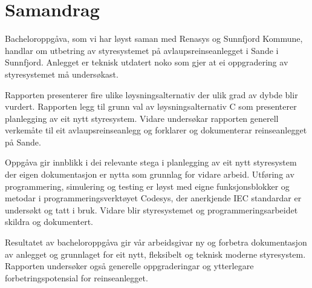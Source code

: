 \chapter{Samandrag}
\thispagestyle{romanpages}

Bacheloroppgåva, som vi har løyst saman med \gls{Renasys} og \gls{Sunnfjord Kommune}, handlar om utbetring av styresystemet på 
avlaupsreinseanlegget i Sande i Sunnfjord. 
Anlegget er teknisk utdatert noko som gjer at ei oppgradering av styresystemet må undersøkast.

Rapporten presenterer fire ulike løysningsalternativ
der ulik grad av dybde blir vurdert. \newline
Rapporten legg til grunn val av løysningsalternativ C som presenterer planlegging av eit nytt styresystem.
Vidare undersøkar rapporten generell verkemåte til eit avlaupsreinseanlegg og forklarer og dokumenterar reinseanlegget på Sande.

Oppgåva gir innblikk i dei relevante stega i planlegging av eit nytt styresystem der eigen dokumentasjon er nytta som grunnlag for vidare arbeid. 
Utføring av programmering, simulering og testing er løyst med eigne funksjonsblokker og metodar i programmeringsverktøyet \gls{Codesys},
der anerkjende \gls{IEC} standardar er undersøkt og tatt i bruk.
Vidare blir styresystemet og programmeringsarbeidet skildra og dokumentert.

Resultatet av bacheloroppgåva gir vår arbeidsgivar ny og forbetra dokumentasjon av anlegget 
og grunnlaget for eit nytt, fleksibelt og teknisk moderne styresystem. 
Rapporten undersøker også generelle oppgraderingar og ytterlegare forbetringspotensial for reinseanlegget.